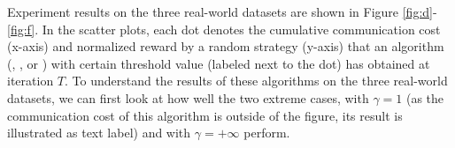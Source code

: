 Experiment results on the three real-world datasets are shown in Figure \ref{fig:d}-\ref{fig:f}. 
In the scatter plots, each dot denotes the cumulative communication cost (x-axis) and normalized reward by a random strategy (y-axis) that an algorithm (\modelone{}, \modeltwo{}, or \modelbaseline{}) with certain threshold value (labeled next to the dot) has obtained at iteration $T$.
To understand the results of these algorithms on the three real-world datasets, we can first look at how well the two extreme cases, \modelone{} with $\gamma=1$ (as the communication cost of this algorithm is outside of the figure, its result is illustrated as text label) and \modelone{} with $\gamma=+\infty$ perform. 

\begin{figure}
\centering     %
\vspace{-2mm}
\vspace{-2mm}

\end{figure}
